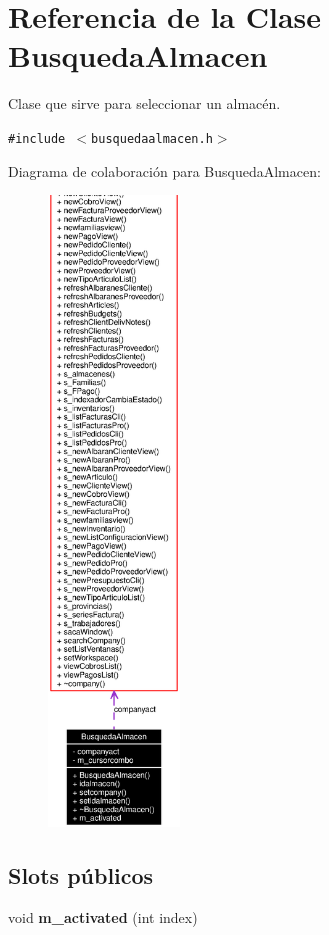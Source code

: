 \section{Referencia de la Clase Busqueda\-Almacen}
\label{classBusquedaAlmacen}
Clase que sirve para seleccionar un almac\'{e}n.  


{\tt \#include $<$busquedaalmacen.h$>$}

Diagrama de colaboraci\'{o}n para Busqueda\-Almacen:\begin{figure}[H]
\begin{center}
\leavevmode
\includegraphics[width=99pt]{classBusquedaAlmacen__coll__graph}
\end{center}
\end{figure}
\subsection*{Slots p\'{u}blicos}
\begin{CompactItemize}
\item 
void {\bf m\_\-activated} (int index)\label{classBusquedaAlmacen_i0}

\end{CompactItemize}
